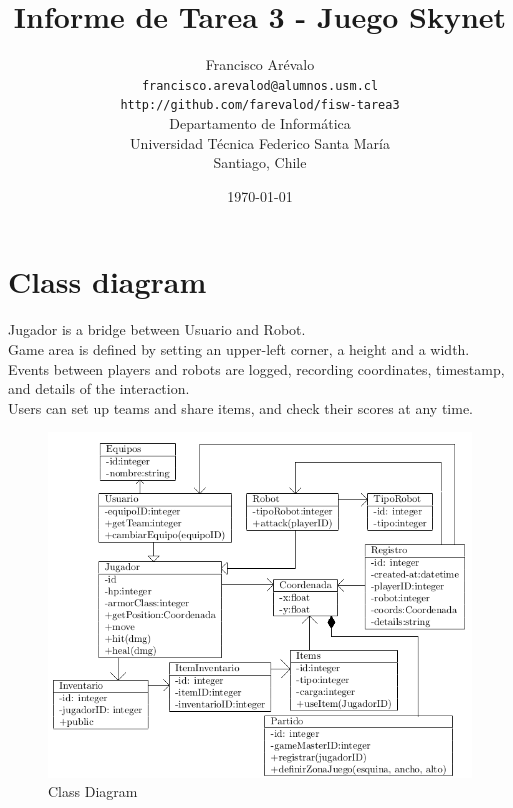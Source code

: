 \documentclass{beamer}
\title{Informe de Tarea 3 - Juego Skynet}
\author{Francisco Ar\'evalo\\
  \texttt{francisco.arevalod@alumnos.usm.cl}\\
  \texttt{http://github.com/farevalod/fisw-tarea3}\\
  \vspace{10mm}
  Departamento de Inform\'atica\\
  Universidad T\'ecnica Federico Santa Mar\'ia\\
  Santiago, Chile}
\date{\today}
\begin{document}
\maketitle
\section{Class diagram}
\begin{frame}
Jugador is a bridge between Usuario and Robot.\\
Game area is defined by setting an upper-left corner, a height and a width.\\
Events between players and robots are logged, recording coordinates, timestamp, and details of the interaction.\\
Users can set up teams and share items, and check their scores at any time.
\begin{figure}[htb]
\centering
\includegraphics[scale=0.3]{clases}
\caption{Class Diagram}
\end{figure}
\end{frame}
\end{document}
